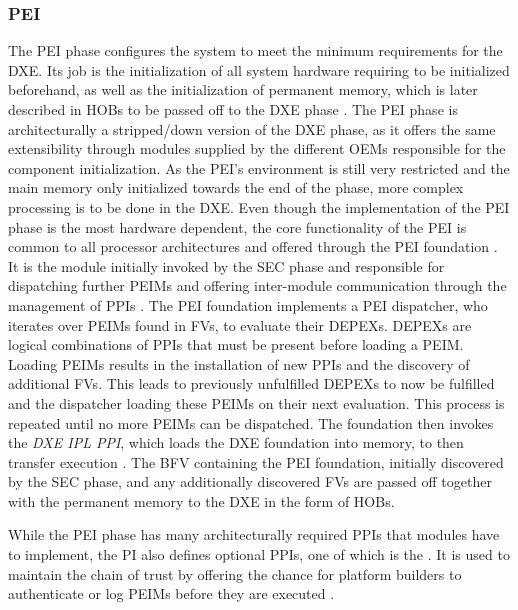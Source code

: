 \subsubsection{\acf{PEI}}

The \ac{PEI} phase configures the system to meet the minimum requirements for the \acf{DXE}.
Its job is the initialization of all system hardware requiring to be initialized beforehand, as well as the initialization of permanent memory, which is later described in \acp{HOB} to be passed off to the \ac{DXE} phase \cite[Vol. 1, 2.1]{pi-spec}.
The \ac{PEI} phase is architecturally a stripped\-/down version of the \ac{DXE} phase, as it offers the same extensibility through modules supplied by the different \acp{OEM} responsible for the component initialization.
As the \ac{PEI}'s environment is still very restricted and the main memory only initialized towards the end of the phase, more complex processing is to be done in the \ac{DXE}.
Even though the implementation of the \ac{PEI} phase is the most hardware dependent, the core functionality of the \ac{PEI} is common to all processor architectures and offered through the \ac{PEI} foundation \cite[Vol. 1, 2.2]{pi-spec}.
It is the module initially invoked by the \ac{SEC} phase and responsible for dispatching further \acp{PEIM} and offering inter-module communication through the management of \acp{PPI} \cite[Vol. 1, 2.5]{pi-spec}.
The \ac{PEI} foundation implements a \ac{PEI} dispatcher, who iterates over \acp{PEIM} found in \acp{FV}, to evaluate their \acp{DEPEX}.
\acp{DEPEX} are logical combinations of \acp{PPI} that must be present before loading a \ac{PEIM}.
Loading \acp{PEIM} results in the installation of new \acp{PPI} and the discovery of additional \acp{FV}.
This leads to previously unfulfilled \acp{DEPEX} to now be fulfilled and the dispatcher loading these \acp{PEIM} on their next evaluation.
This process is repeated until no more \acp{PEIM} can be dispatched.
The foundation then invokes the \emph{\ac{DXE} IPL \ac{PPI}}, which loads the \ac{DXE} foundation into memory, to then transfer execution \cite[Vol. 1, 2.6]{pi-spec}.
The \ac{BFV} containing the \ac{PEI} foundation, initially discovered by the \ac{SEC} phase, and any additionally discovered \acp{FV} are passed off together with the permanent memory to the \ac{DXE} in the form of \acp{HOB}.

While the \ac{PEI} phase has many architecturally required \acp{PPI} that modules have to implement, the \ac{PI} also defines optional \acp{PPI}, one of which is the .
It is used to maintain the chain of trust by offering the chance for platform builders to authenticate or log \acp{PEIM} before they are executed \cite[Vol. 1, 6.3.6]{pi-spec}.


